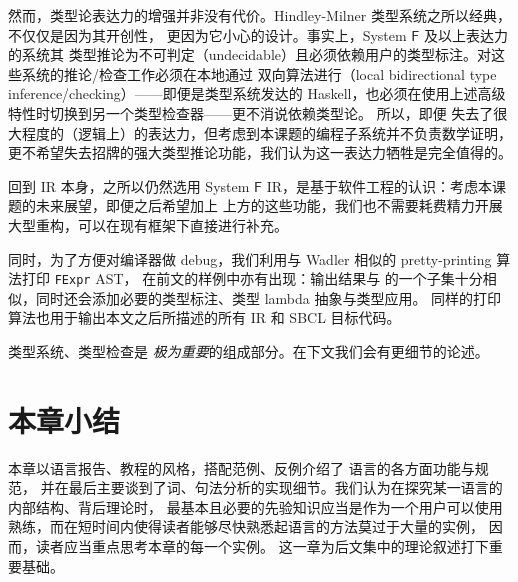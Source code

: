 然而，类型论表达力的增强并非没有代价。Hindley-Milner 类型系统之所以经典，不仅仅是因为其开创性，
更因为它小心的设计。事实上，System $\mathsf{F}$ 及以上表达力的系统其
类型推论为不可判定（undecidable）且必须依赖用户的类型标注。对这些系统的推论/检查工作必须在本地通过
双向算法进行（local bidirectional type inference/checking）——即便是类型系统发达的
Haskell，也必须在使用上述高级特性时切换到另一个类型检查器——更不消说依赖类型论。
所以，即便 \Tigris 失去了很大程度的（逻辑上）的表达力，但考虑到本课题的编程子系统并不负责数学证明，
更不希望失去招牌的强大类型推论功能，我们认为这一表达力牺牲是完全值得的。

回到 IR 本身，之所以仍然选用 System $\mathsf{F}$ IR，是基于软件工程的认识：考虑本课题的未来展望，即便之后希望加上
上方的这些功能，我们也不需要耗费精力开展大型重构，可以在现有框架下直接进行补充。

同时，为了方便对编译器做 debug，我们利用与 Wadler 相似的 pretty-printing 算法打印 \texttt{FExpr} AST，
在前文的样例中亦有出现：输出结果与 \Tigris 的一个子集十分相似，同时还会添加必要的类型标注、类型 lambda 抽象与类型应用。
同样的打印算法也用于输出本文之后所描述的所有 IR 和 SBCL 目标代码。

类型系统、类型检查是 \Tigris \emph{极为重要}的组成部分。在下文我们会有更细节的论述。
\section{本章小结}
本章以语言报告、教程的风格，搭配范例、反例介绍了 \Tigris 语言的各方面功能与规范，
并在最后主要谈到了词、句法分析的实现细节。我们认为在探究某一语言的内部结构、背后理论时，
最基本且必要的先验知识应当是作为一个用户可以使用熟练，而在短时间内使得读者能够尽快熟悉起语言的方法莫过于大量的实例，
因而，读者应当重点思考本章的每一个实例。
这一章为后文集中的理论叙述打下重要基础。